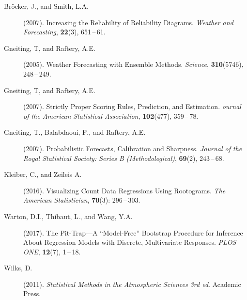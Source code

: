 \documentclass[twoside]{report}
\begin{document}
\begin{description}
\item [Bröcker, J., and Smith, L.A.] (2007).
    Increasing the Reliability of Reliability Diagrams.
    {\it Weather and Forecasting},
    {\bf 22}(3), 651\,--\,61.
\item[Gneiting, T, and Raftery, A.E.] (2005).
    Weather Forecasting with Ensemble Methods.
    {\it Science},
    {\bf 310}(5746), 248\,--\,249.
\item[Gneiting, T, and Raftery, A.E.] (2007).
    Strictly Proper Scoring Rules, Prediction, and Estimation.
    {\it ournal of the American Statistical Association},
    {\bf 102}(477), 359\,--\,78.
\item[Gneiting, T., Balabdaoui, F., and Raftery, A.E.] (2007).
    Probabilistic Forecasts, Calibration and Sharpness.
    {\it Journal of the Royal Statistical Society: Series B (Methodological)},
    {\bf 69}(2), 243\,--\,68.
\item [Kleiber, C., and Zeileis A.] (2016).
    Visualizing Count Data Regressions Using Rootograms.
    {\it The American Statistician},
    {\bf 70}(3): 296\,--\,303.
\item [Warton, D.I., Thibaut, L., and Wang, Y.A.] (2017).
    The Pit-Trap---{A} ``Model-Free'' Bootstrap Procedure for Inference About
    Regression Models with Discrete, Multivariate Responses.
    {\it PLOS ONE},
    {\bf 12}(7), 1\,--\,18.
\item [Wilks, D.] (2011).
    {\it Statistical Methods in the Atmospheric Sciences 3rd ed}.
    Academic Press.
\end{description}
\end{document}
